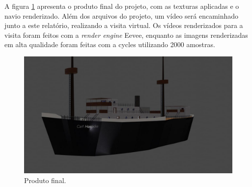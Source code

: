 A figura \ref{fig:pf} apresenta o produto final do projeto, com as texturas aplicadas e o navio renderizado. Além dos arquivos do projeto, um vídeo será encaminhado junto a este relatório, realizando a visita virtual. Os vídeos renderizados para a visita foram feitos com a \textit{render engine} Eevee, enquanto as imagens renderizadas em alta qualidade foram feitas com a cycles utilizando 2000 amostras.  

\begin{figure}[!h]
    \centering
    \includegraphics[scale=0.3]{imagens/render1.jpg}
    \caption{Produto final.}
    \label{fig:pf}
\end{figure}